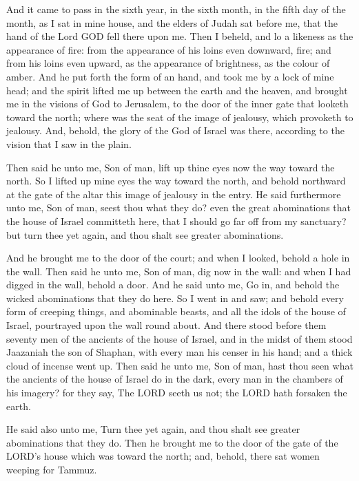  And it came to pass in the sixth year, in the sixth month,
in the fifth day of the month, as I sat in mine house, and the elders of
Judah sat before me, that the hand of the Lord GOD fell there upon me.
 Then I beheld, and lo a likeness as the appearance of fire:
from the appearance of his loins even downward, fire; and from his loins
even upward, as the appearance of brightness, as the colour of amber.
 And he put forth the form of an hand, and took me by a lock
of mine head; and the spirit lifted me up between the earth and the
heaven, and brought me in the visions of God to Jerusalem, to the door
of the inner gate that looketh toward the north; where was the seat of
the image of jealousy, which provoketh to jealousy.  And,
behold, the glory of the God of Israel was there, according to the
vision that I saw in the plain.

 Then said he unto me, Son of man, lift up thine eyes now
the way toward the north. So I lifted up mine eyes the way toward the
north, and behold northward at the gate of the altar this image of
jealousy in the entry.  He said furthermore unto me, Son of
man, seest thou what they do? even the great abominations that the house
of Israel committeth here, that I should go far off from my sanctuary?
but turn thee yet again, and thou shalt see greater abominations.

 And he brought me to the door of the court; and when I
looked, behold a hole in the wall.  Then said he unto me,
Son of man, dig now in the wall: and when I had digged in the wall,
behold a door.  And he said unto me, Go in, and behold the
wicked abominations that they do here.  So I went in and
saw; and behold every form of creeping things, and abominable beasts,
and all the idols of the house of Israel, pourtrayed upon the wall round
about.  And there stood before them seventy men of the
ancients of the house of Israel, and in the midst of them stood
Jaazaniah the son of Shaphan, with every man his censer in his hand; and
a thick cloud of incense went up.  Then said he unto me,
Son of man, hast thou seen what the ancients of the house of Israel do
in the dark, every man in the chambers of his imagery? for they say, The
LORD seeth us not; the LORD hath forsaken the earth.

 He said also unto me, Turn thee yet again, and thou
shalt see greater abominations that they do.  Then he
brought me to the door of the gate of the LORD's house which was toward
the north; and, behold, there sat women weeping for Tammuz.

